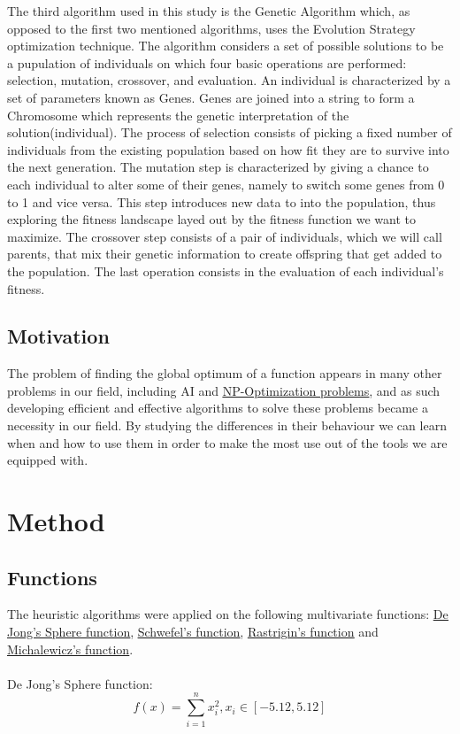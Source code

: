 \documentclass{article}
\begin{document}
The third algorithm used in this study is the Genetic Algorithm which, as opposed to the first two mentioned algorithms, uses the Evolution Strategy optimization technique. The algorithm considers a set of possible solutions to be a pupulation of individuals on which four basic operations are performed: selection, mutation, crossover, and evaluation. An individual is characterized by a set of parameters known as Genes. Genes are joined into a string to form a Chromosome which represents the genetic interpretation of the solution(individual). The process of selection consists of picking a fixed number of individuals from the existing population based on how fit they are to survive into the next generation. The mutation step is characterized by giving a chance to each individual to alter some of their genes, namely to switch some genes from 0 to 1 and vice versa. This step introduces new data to into the population, thus exploring the fitness landscape layed out by the fitness function we want to maximize. The crossover step consists of a pair of individuals, which we will call parents, that mix their genetic information to create offspring that get added to the population. The last operation consists in the evaluation of each individual's fitness.
\subsection{Motivation}
The problem of finding the global optimum of a function appears in many other problems in our field, including AI and \underline{\href{https://en.wikipedia.org/wiki/Combinatorial_optimization}{NP-Optimization problems}}, and as such developing efficient and effective algorithms to solve these problems became a necessity in our field. By studying the differences in their behaviour we can learn when and how to use them in order to make the most use out of the tools we are equipped with.
\section{Method}
\subsection{Functions}
The heuristic algorithms were applied on the following multivariate functions: \underline{\href{http://www.geatbx.com/docu/fcnindex-01.html\#P89_3085}{De Jong's Sphere function}}, \underline{\href{http://www.geatbx.com/docu/fcnindex-01.html\#P150_6749}{Schwefel's function}}, \underline{\href{http://www.geatbx.com/docu/fcnindex-01.html\#P140_6155}{Rastrigin's function}} and \\\underline{\href{http://www.geatbx.com/docu/fcnindex-01.html\#P204_10395}{Michalewicz's function}}\cite{Functions}.
\\ \\
De Jong's Sphere function:
$$ f(x) = \sum_{i = 1}^n x_i^2, 
x_i \in \left[ -5.12, 5.12 \right] $$
\end{document}
